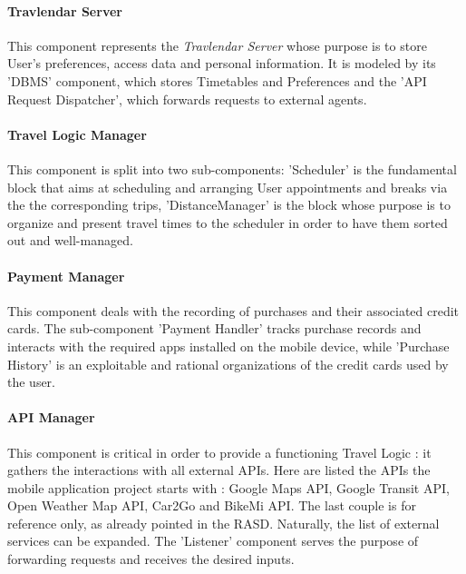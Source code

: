 \paragraph{Travlendar Server} 
	This component represents the \textit{Travlendar Server} whose purpose is to store User's preferences, access data and personal information. It is modeled by its 'DBMS' component, which stores Timetables and Preferences and the 'API Request Dispatcher', which forwards requests to external agents.

\paragraph{Travel Logic Manager}
	This component is split into two sub-components: 'Scheduler' is the fundamental block that aims at scheduling and arranging User appointments and breaks via the the corresponding trips, 'DistanceManager' is the block whose purpose is to organize and present travel times to the scheduler in order to have them sorted out and well-managed.

\paragraph{Payment Manager}
	This component deals with the recording of purchases and their associated credit cards.
	The sub-component 'Payment Handler' tracks purchase records and interacts with the required apps installed on the mobile device, while 'Purchase History' is an exploitable and rational organizations of the credit cards used by the user.

\paragraph{API Manager} 
	This component is critical in order to provide a functioning Travel Logic : it gathers the interactions with all external APIs.
	Here are listed the APIs the mobile application project starts with : Google Maps API, Google Transit API, Open Weather Map API, Car2Go and BikeMi API. The last couple is for reference only, as already pointed in the RASD. Naturally, the list of external services can be expanded.
	The 'Listener' component serves the purpose of forwarding requests and receives the desired inputs.




